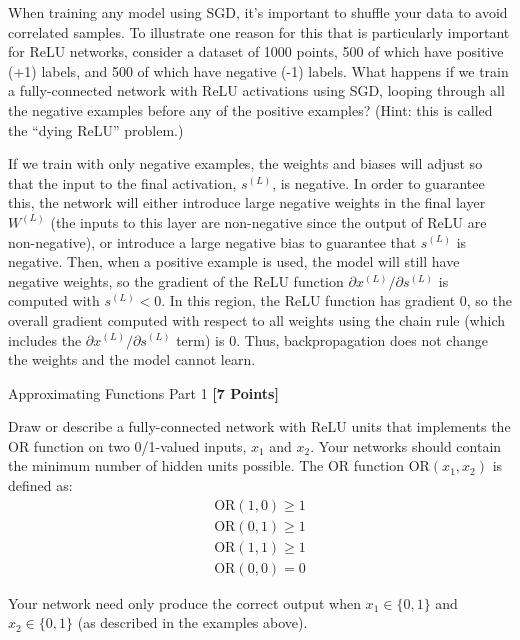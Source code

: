 When training any model using SGD, it's important to shuffle your data to avoid correlated samples. To illustrate one reason for this that is particularly important for ReLU networks, consider a dataset of 1000 points, 500 of which have positive (+1) labels, and 500 of which have negative (-1) labels. What happens if we train a fully-connected network with ReLU activations using SGD, looping through all the negative examples before any of the positive examples? (Hint: this is called the ``dying ReLU'' problem.)

\begin{solution}
    If we train with only negative examples, the weights and biases will adjust so that the input to the final activation, $s^{(L)}$, is negative. In order to guarantee this, the network will either introduce large negative weights in the final layer $W^{(L)}$ (the inputs to this layer are non-negative since the output of ReLU are non-negative), or introduce a large negative bias to guarantee that $s^{(L)}$ is negative. Then, when a positive example is used, the model will still have negative weights, so the gradient of the ReLU function $\partial x^{(L)} / \partial s^{(L)}$ is computed with $s^{(L)} < 0$. In this region, the ReLU function has gradient 0, so the overall gradient computed with respect to all weights using the chain rule (which includes the $\partial x^{(L)} / \partial s^{(L)}$ term) is 0. Thus, backpropagation does not change the weights and the model cannot learn.
\end{solution}

\newpage

\problem Approximating Functions Part 1 \textbf{[7 Points]}

Draw or describe a fully-connected network with ReLU units that implements the OR function on two 0/1-valued inputs,  $x_1$ and $x_2$.  Your networks should contain the minimum number of hidden units possible.  The OR function $\text{OR}(x_1, x_2)$ is defined as:
\begin{gather*}
\text{OR}(1, 0) \geq 1 \\
\text{OR}(0, 1) \geq 1 \\
\text{OR}(1, 1) \geq 1 \\
\text{OR}(0, 0) = 0
\end{gather*}

Your network need only produce the correct output when $x_1 \in \{0, 1\}$ and $x_2 \in \{0, 1\}$ (as described in the examples above).

